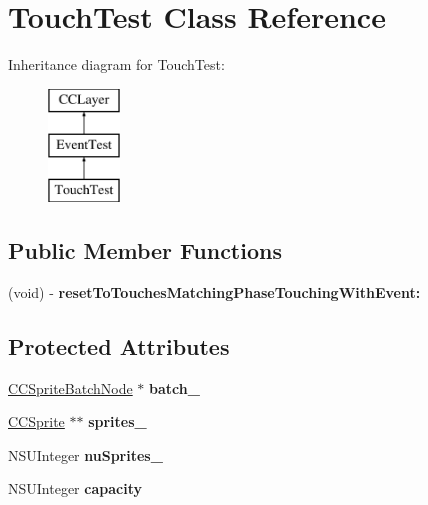 \hypertarget{interface_touch_test}{\section{Touch\-Test Class Reference}
\label{interface_touch_test}
}
Inheritance diagram for Touch\-Test\-:\begin{figure}[H]
\begin{center}
\leavevmode
\includegraphics[height=3.000000cm]{interface_touch_test}
\end{center}
\end{figure}
\subsection*{Public Member Functions}
\begin{DoxyCompactItemize}
\item 
\hypertarget{interface_touch_test_ac65447212da4ea45bbb7d574f450fd47}{(void) -\/ {\bfseries reset\-To\-Touches\-Matching\-Phase\-Touching\-With\-Event\-:}}\label{interface_touch_test_ac65447212da4ea45bbb7d574f450fd47}

\end{DoxyCompactItemize}
\subsection*{Protected Attributes}
\begin{DoxyCompactItemize}
\item 
\hypertarget{interface_touch_test_a254b61c43d8e66606fc14ee5c89ebf83}{\hyperlink{interface_c_c_sprite_batch_node}{C\-C\-Sprite\-Batch\-Node} $\ast$ {\bfseries batch\-\_\-}}\label{interface_touch_test_a254b61c43d8e66606fc14ee5c89ebf83}

\item 
\hypertarget{interface_touch_test_ad7bcfbb5e934d1c8548dc334731a82a1}{\hyperlink{class_c_c_sprite}{C\-C\-Sprite} $\ast$$\ast$ {\bfseries sprites\-\_\-}}\label{interface_touch_test_ad7bcfbb5e934d1c8548dc334731a82a1}

\item 
\hypertarget{interface_touch_test_a8c0046e24e48c4737ee7594ff5c1c2e5}{N\-S\-U\-Integer {\bfseries nu\-Sprites\-\_\-}}\label{interface_touch_test_a8c0046e24e48c4737ee7594ff5c1c2e5}

\item 
\hypertarget{interface_touch_test_a582aa1cdc0e725c1037a34b3917a04dd}{N\-S\-U\-Integer {\bfseries capacity}}\label{interface_touch_test_a582aa1cdc0e725c1037a34b3917a04dd}

\end{DoxyCompactItemize}


